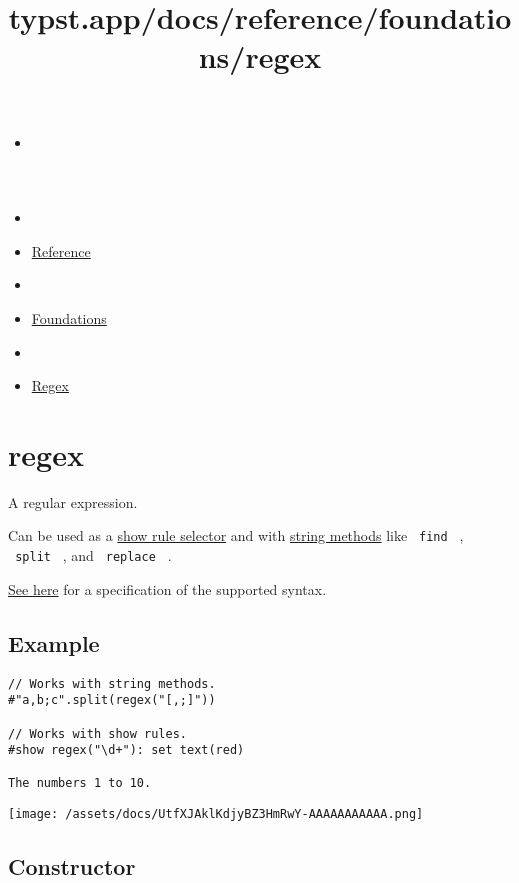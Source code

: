 \title{typst.app/docs/reference/foundations/regex}

\begin{itemize}
\tightlist
\item
  \href{/docs}{}
\item
  
\item
  \href{/docs/reference/}{Reference}
\item
  
\item
  \href{/docs/reference/foundations/}{Foundations}
\item
  
\item
  \href{/docs/reference/foundations/regex/}{Regex}
\end{itemize}

\section{\texorpdfstring{{ regex }}{ regex }}\label{summary}

A regular expression.

Can be used as a \href{/docs/reference/styling/\#show-rules}{show rule
selector} and with \href{/docs/reference/foundations/str/}{string
methods} like \texttt{\ find\ } , \texttt{\ split\ } , and
\texttt{\ replace\ } .

\href{https://docs.rs/regex/latest/regex/\#syntax}{See here} for a
specification of the supported syntax.

\subsection{Example}\label{example}

\begin{verbatim}
// Works with string methods.
#"a,b;c".split(regex("[,;]"))

// Works with show rules.
#show regex("\d+"): set text(red)

The numbers 1 to 10.
\end{verbatim}

\texttt{[image: /assets/docs/UtfXJAklKdjyBZ3HmRwY-AAAAAAAAAAA.png]}

\subsection{\texorpdfstring{Constructor
{}}{Constructor }}\label{constructor}


